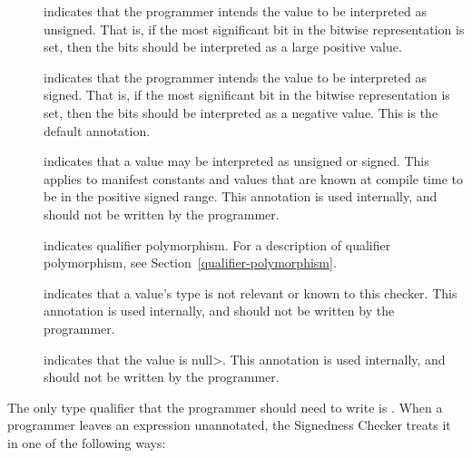 \begin{description}

\item[]
    indicates that the programmer intends the value to be
    interpreted as unsigned.
    That is, if the most significant bit in the bitwise representation is
    set, then the bits should be interpreted as a large positive value.

\item[]
    indicates that the programmer intends the value to be
    interpreted as signed.
    That is, if the most significant bit in the bitwise representation is
    set, then the bits should be interpreted as a negative value.
    This is the default annotation.

\item[]
    indicates that a value may be
    interpreted as unsigned or signed.
    This applies to manifest constants and values that are known at compile
    time to be in the positive signed range.
    This annotation is used internally, and should not
    be written by the programmer.

 \item[]
   indicates qualifier polymorphism.
   For a description of qualifier polymorphism, see
   Section~\ref{qualifier-polymorphism}.

\item[]
    indicates that a value's type is not relevant or known to this checker.
    This annotation is used internally, and should not be
    written by the programmer.

\item[]
  indicates that the value is \<null>.
    This annotation is used internally, and should not
    be written by the programmer.

\end{description}



The only type qualifier that the programmer should need to write is
.
When a programmer leaves an expression unannotated, the
Signedness Checker treats it in one of the following ways:

